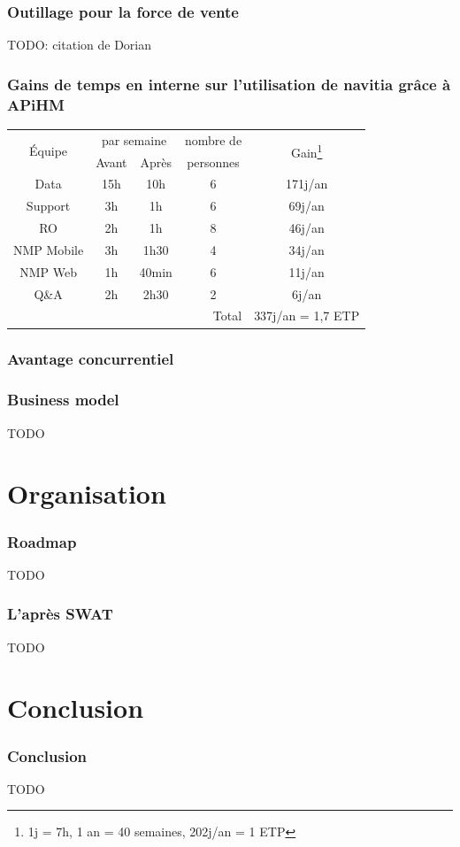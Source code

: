 \documentclass[table]{beamer}
\begin{document}
\begin{frame}
  \frametitle{Outillage pour la force de vente}

  TODO: citation de Dorian
\end{frame}

\begin{frame}
  \frametitle{Gains de temps en interne sur l'utilisation de navitia
    grâce à APiHM}

  \centering

  \begin{tabular}{|c|c|c|c|c|}
    \hline
    \multirow{2}{*}{Équipe}& \multicolumn{2}{c|}{par
      semaine}&nombre de&\multirow{2}{*}{Gain\footnote{1j = 7h,
        1 an = 40 semaines, 202j/an = 1 ETP}}\\
    \hhline{~--~~}
    & Avant & Après & personnes &\\
    \hline
    Data       &15h &10h & 6 & 171j/an\\
    Support    & 3h & 1h & 6 &  69j/an\\
    RO         & 2h & 1h & 8 &  46j/an\\
    NMP Mobile & 3h &1h30& 4 &  34j/an\\
    NMP Web    & 1h &40min&6 &  11j/an\\
    Q\&A       & 2h &2h30& 2 &   6j/an\\
    \hline
    \multicolumn{4}{|r|}{Total} &
    337j/an = 1{,}7 ETP\\
    \hline
  \end{tabular}
\end{frame}

\begin{frame}
  \frametitle{Avantage concurrentiel}

  
\end{frame}

\begin{frame}
  \frametitle{Business model}

  TODO
\end{frame}

\section{Organisation}

\begin{frame}
  \frametitle{Roadmap}

  TODO
\end{frame}

\begin{frame}
  \frametitle{L'après SWAT}

  TODO
\end{frame}

\section{Conclusion}

\begin{frame}
  \frametitle{Conclusion}

  TODO
\end{frame}
\end{document}
